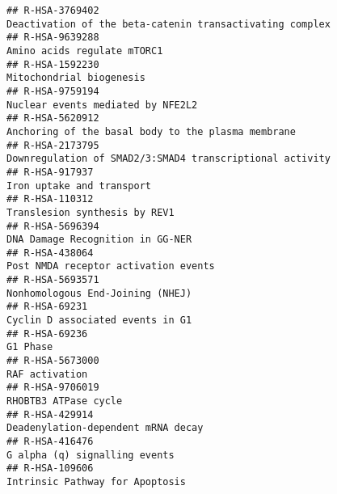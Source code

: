 \documentclass[
]{article}
\begin{document}
\begin{verbatim}
## R-HSA-3769402                                                                             Deactivation of the beta-catenin transactivating complex
## R-HSA-9639288                                                                                                          Amino acids regulate mTORC1
## R-HSA-1592230                                                                                                             Mitochondrial biogenesis
## R-HSA-9759194                                                                                                    Nuclear events mediated by NFE2L2
## R-HSA-5620912                                                                                   Anchoring of the basal body to the plasma membrane
## R-HSA-2173795                                                                             Downregulation of SMAD2/3:SMAD4 transcriptional activity
## R-HSA-917937                                                                                                             Iron uptake and transport
## R-HSA-110312                                                                                                         Translesion synthesis by REV1
## R-HSA-5696394                                                                                                     DNA Damage Recognition in GG-NER
## R-HSA-438064                                                                                                  Post NMDA receptor activation events
## R-HSA-5693571                                                                                                     Nonhomologous End-Joining (NHEJ)
## R-HSA-69231                                                                                                       Cyclin D associated events in G1
## R-HSA-69236                                                                                                                               G1 Phase
## R-HSA-5673000                                                                                                                       RAF activation
## R-HSA-9706019                                                                                                                 RHOBTB3 ATPase cycle
## R-HSA-429914                                                                                                    Deadenylation-dependent mRNA decay
## R-HSA-416476                                                                                                         G alpha (q) signalling events
## R-HSA-109606                                                                                                       Intrinsic Pathway for Apoptosis

\end{verbatim}
\end{document}
